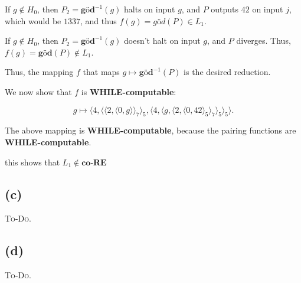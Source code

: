 \noindent
If $g \notin H_0$, then $P_2 = \textbf{göd}^{-1}(g)$ halts on input $g$,  
and $P$ outputs $42$ on input $j$, which would be $1337$,  
and thus $f(g) = göd(P) \in L_1$.

\noindent
If $g \notin H_0$, then $P_2 = \textbf{göd}^{-1}(g)$ doesn’t halt on input $g$, and $P$ diverges.  
Thus, $f(g) = \textbf{göd}(P) \notin L_1$.

\noindent
Thus, the mapping $f$ that maps $g \mapsto \textbf{göd}^{-1}(P)$ is the desired reduction.

\bigskip

\noindent
We now show that $f$ is \textbf{WHILE-computable}:

\[
g \mapsto \langle 4, \langle \langle 2, \langle 0, g \rangle \rangle_7 \rangle_5, \langle 4, \langle g, \langle 2, \langle 0, 42 \rangle_5 \rangle_7 \rangle_5 \rangle_5 \rangle.
\]

\noindent
The above mapping is \textbf{WHILE-computable}, because the pairing functions are \textbf{WHILE-computable}.

this shows that $L_1 \notin \textbf{co-RE} $ 

\subsection{(c)}
\textsc{To-Do.}

\subsection{(d)}
\textsc{To-Do.}


